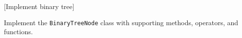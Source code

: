 [Implement binary tree]


Implement the \verb!BinaryTreeNode! class with supporting
methods, operators, and functions.

